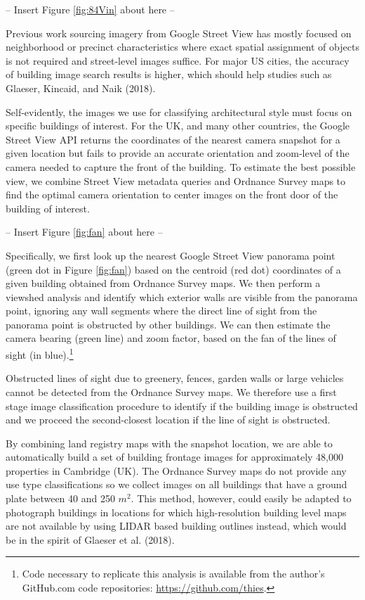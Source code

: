 \documentclass[]{article}
\let\rmarkdownfootnote\footnote%
\def\footnote{\protect\rmarkdownfootnote}
\begin{document}
\begin{center}
  -- Insert Figure \ref{fig:84Vin} about here --
\end{center}

Previous work sourcing imagery from Google Street View has mostly
focused on neighborhood or precinct characteristics where exact spatial
assignment of objects is not required and street-level images suffice.
For major US cities, the accuracy of building image search results is
higher, which should help studies such as Glaeser, Kincaid, and Naik
(2018).

Self-evidently, the images we use for classifying architectural style
must focus on specific buildings of interest. For the UK, and many other
countries, the Google Street View API returns the coordinates of the
nearest camera snapshot for a given location but fails to provide an
accurate orientation and zoom-level of the camera needed to capture the
front of the building. To estimate the best possible view, we combine
Street View metadata queries and Ordnance Survey maps to find the
optimal camera orientation to center images on the front door of the
building of interest.

\begin{center}
  -- Insert Figure \ref{fig:fan} about here --
\end{center}

Specifically, we first look up the nearest Google Street View panorama
point (green dot in Figure \ref{fig:fan}) based on the centroid (red
dot) coordinates of a given building obtained from Ordnance Survey maps.
We then perform a viewshed analysis and identify which exterior walls
are visible from the panorama point, ignoring any wall segments where
the direct line of sight from the panorama point is obstructed by other
buildings. We can then estimate the camera bearing (green line) and zoom
factor, based on the fan of the lines of sight (in
blue).\footnote{Code necessary to replicate this analysis is available from the author's GitHub.com code repositories: \href{https://github.com/thies}{https://github.com/thies}.}

Obstructed lines of sight due to greenery, fences, garden walls or large
vehicles cannot be detected from the Ordnance Survey maps. We therefore
use a first stage image classification procedure to identify if the
building image is obstructed and we proceed the second-closest location
if the line of sight is obstructed.

By combining land registry maps with the snapshot location, we are able
to automatically build a set of building frontage images for
approximately 48,000 properties in Cambridge (UK). The Ordnance Survey
maps do not provide any use type classifications so we collect images on
all buildings that have a ground plate between 40 and 250 \(m^2\). This
method, however, could easily be adapted to photograph buildings in
locations for which high-resolution building level maps are not
available by using LIDAR based building outlines instead, which would be
in the spirit of Glaeser et al. (2018).
\end{document}

